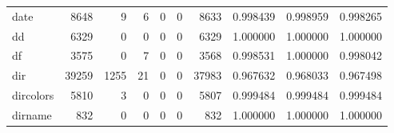 \begin{tabular}{lrrrrrrrrr}
date      &                                8648 &                                               9 &                                              6 &                                             0 &                                              0 &                                         8633 &                                           0.998439 &                               0.998959 &                             0.998265 \\
dd        &                                6329 &                                               0 &                                              0 &                                             0 &                                              0 &                                         6329 &                                           1.000000 &                               1.000000 &                             1.000000 \\
df        &                                3575 &                                               0 &                                              7 &                                             0 &                                              0 &                                         3568 &                                           0.998531 &                               1.000000 &                             0.998042 \\
dir       &                               39259 &                                            1255 &                                             21 &                                             0 &                                              0 &                                        37983 &                                           0.967632 &                               0.968033 &                             0.967498 \\
dircolors &                                5810 &                                               3 &                                              0 &                                             0 &                                              0 &                                         5807 &                                           0.999484 &                               0.999484 &                             0.999484 \\
dirname   &                                 832 &                                               0 &                                              0 &                                             0 &                                              0 &                                          832 &                                           1.000000 &                               1.000000 &                             1.000000 \\

\end{tabular}
